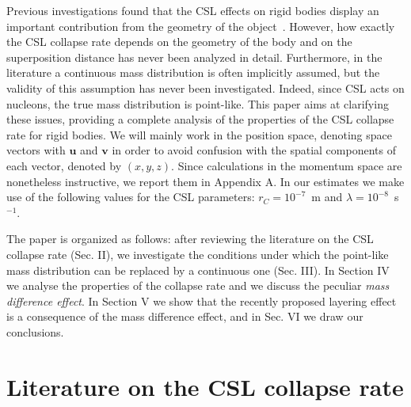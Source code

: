 \documentclass[11pt,onecolumn,amssymb,nofootinbib]{revtex4}
\newcommand\bk{\boldsymbol{k}}
\newcommand\bu{\boldsymbol{u}}
\newcommand\bv{\boldsymbol{v}}
\begin{document}
Previous investigations found that the CSL effects on rigid bodies display an important contribution from the geometry of the object~\cite{NimHorHam14,Beletal16,Caretal16}. However, how exactly the CSL collapse rate depends on the geometry of the body and on the superposition distance has never been analyzed in detail. Furthermore, in the literature a continuous mass distribution is often implicitly assumed, but the validity of this assumption has never been investigated. Indeed, since CSL acts on  nucleons, the true mass distribution is point-like.
This paper aims at clarifying these issues, providing a complete analysis of the properties of the CSL collapse rate for rigid bodies. We will mainly work in the position space, denoting space vectors with $\bu$ and $\bv$ in order to avoid confusion with the spatial components of each vector, denoted by $(x,y,z)$. Since calculations in the momentum space are nonetheless instructive, we report them in Appendix A. %
In our estimates we make use of the following values for the CSL parameters: $r_C=10^{-7}$~m and $\lambda=10^{-8}$~s$^{-1}$\cite{Adl07}.

The paper is organized as follows: after reviewing the literature on the CSL collapse rate (Sec. II), we investigate the conditions under which the point-like mass distribution can be replaced by a continuous one (Sec. III). In Section IV we analyse the properties of the collapse rate and we discuss the peculiar \emph{mass difference effect}. In Section V we show that the recently proposed layering effect is a consequence of the mass difference effect, and in Sec. VI we draw our conclusions.

 
\section{Literature on the CSL collapse rate}
\end{document}
